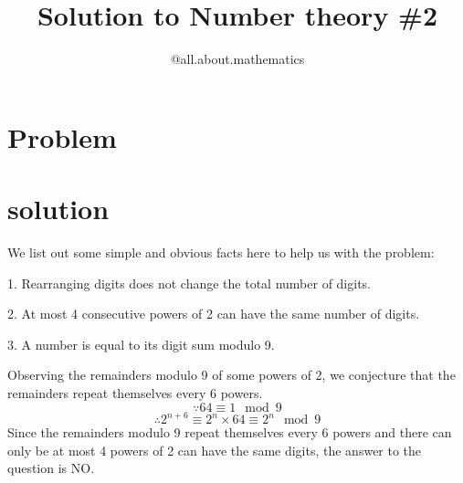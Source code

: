 \documentclass[12pt]{article}
\title{Solution to Number theory \#2}
\author{@all.about.mathematics}
\begin{document}
\maketitle
\section{Problem}
\noindent{}
\section{solution}
We list out some simple and obvious facts here to help us with the problem:

1. Rearranging digits does not change the total number of digits.

2. At most 4 consecutive powers of 2 can have the same number of digits.

3. A number is equal to its digit sum modulo 9.


\noindent{}

Observing the remainders modulo 9 of some powers of 2, we conjecture that the remainders repeat themselves every 6 powers.
$$\because 64\equiv1 \mod 9$$
$$\therefore 2^{n+6}\equiv2^n\times 64\equiv 2^n \mod 9$$
Since the remainders modulo 9 repeat themselves every 6 powers and there can only be at most 4 powers of 2 can have the same digits, the answer to the question is NO.
\end{document}
